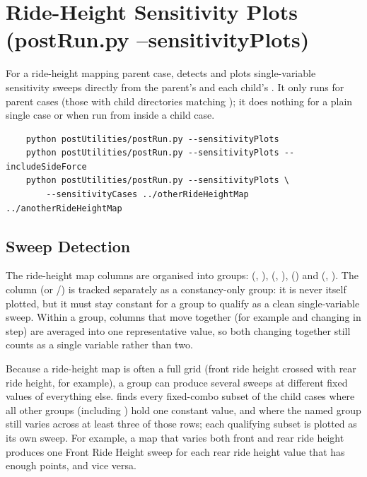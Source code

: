 \section{Ride-Height Sensitivity Plots (postRun.py --sensitivityPlots)}
For a ride-height mapping parent case,  detects and plots single-variable sensitivity sweeps directly from the parent's  and each child's . It only runs for parent cases (those with child directories matching ); it does nothing for a plain single case or when run from inside a child case.

\begin{lstlisting}
    python postUtilities/postRun.py --sensitivityPlots
    python postUtilities/postRun.py --sensitivityPlots --includeSideForce
    python postUtilities/postRun.py --sensitivityPlots \
        --sensitivityCases ../otherRideHeightMap ../anotherRideHeightMap
\end{lstlisting}

\subsection{Sweep Detection}
The ride-height map columns are organised into groups:  (, ),  (, ),  () and  (, ). The  column (or /) is tracked separately as a constancy-only group: it is never itself plotted, but it must stay constant for a group to qualify as a clean single-variable sweep. Within a group, columns that move together (for example  and  changing in step) are averaged into one representative value, so both changing together still counts as a single variable rather than two.

Because a ride-height map is often a full grid (front ride height crossed with rear ride height, for example), a group can produce several sweeps at different fixed values of everything else.  finds every fixed-combo subset of the child cases where all other groups (including ) hold one constant value, and where the named group still varies across at least three of those rows; each qualifying subset is plotted as its own sweep. For example, a map that varies both front and rear ride height produces one Front Ride Height sweep for each rear ride height value that has enough points, and vice versa.

